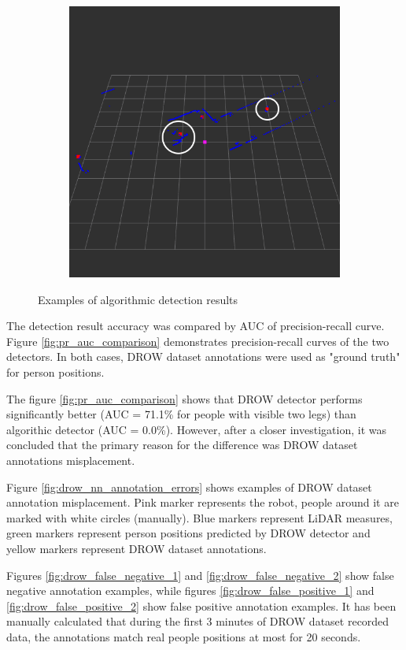 \documentclass{article}
\begin{document}
\begin{figure}[t]
\begin{subfigure}{.5\textwidth}
		\caption{}
		\label{fig:ftd_al_positive_wc}
	\end{subfigure}%
	\begin{subfigure}{.5\linewidth}
		\centering
		\includegraphics[width=.65\linewidth, height=.65\linewidth]{ftd_al_positive_both}
		\caption{}
		\label{fig:ftd_al_positive_both}
	\end{subfigure}
	\caption{Examples of algorithmic detection results}
	\label{fig:drow_al_detection_results}
\end{figure}

The detection result accuracy was compared by AUC of precision-recall curve\cite{prec_rec_curve}.
Figure \ref{fig:pr_auc_comparison} demonstrates precision-recall curves of the two detectors.
In both cases, DROW dataset annotations were used as "ground truth" for person positions.

The figure \ref{fig:pr_auc_comparison} shows that DROW detector performs significantly better (AUC = 71.1\% for people with visible two legs) than algorithic detector (AUC = 0.0\%).
However, after a closer investigation, it was concluded that the primary reason for the difference was DROW dataset annotations misplacement.

Figure \ref{fig:drow_nn_annotation_errors} shows examples of DROW dataset annotation misplacement.
Pink marker represents the robot, people around it are marked with white circles (manually).
Blue markers represent LiDAR measures, green markers represent person positions predicted by DROW detector and yellow markers represent DROW dataset annotations.

Figures \ref{fig:drow_false_negative_1} and \ref{fig:drow_false_negative_2} show false negative annotation examples,
while figures \ref{fig:drow_false_positive_1} and \ref{fig:drow_false_positive_2} show false positive annotation examples.
It has been manually calculated that during the first 3 minutes of DROW dataset recorded data, the annotations match real people positions at most for 20 seconds.
\end{document}
